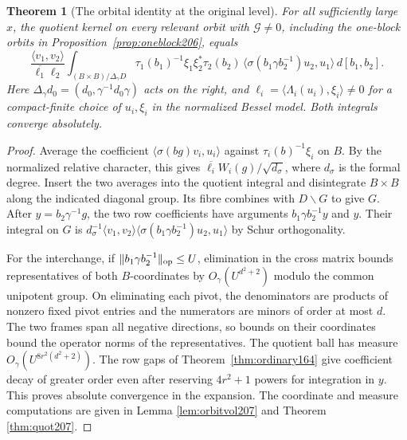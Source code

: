 \documentclass[a4paper,11pt]{article}
\newtheorem{theorem}[proposition]{Theorem}
\theoremstyle{definition}
\theoremstyle{remark}
\numberwithin{equation}{section}
\begin{document}
\begin{theorem}[The orbital identity at the original level]
\label{thm:quot208}
For all sufficiently large \(x\), the quotient kernel on every
relevant orbit with \(\mathcal G\ne0\), including the one-block
orbits in Proposition~\ref{prop:oneblock206}, equals
\begin{equation}
 \frac{\langle v_1,v_2\rangle}{\overline{\ell_1}\ell_2}
 \int_{(B\times B)/\Delta_\gamma D}
   \tau_1(b_1)^{-1}\xi_1\xi_2^*\tau_2(b_2)\,
       \langle\sigma(b_1\gamma b_2^{-1})u_2,u_1\rangle\,d[b_1,b_2].
                                                        \label{eq:quot208}
\end{equation}
Here \(\Delta_\gamma d_0=(d_0,\gamma^{-1}d_0\gamma)\) acts on the
right, and \(\ell_i=\langle\Lambda_i(u_i),\xi_i\rangle\ne0\)
for a compact-finite choice of \(u_i,\xi_i\) in the normalized
Bessel model. Both integrals converge absolutely.
\end{theorem}
\begin{proof}
Average the coefficient \(\langle\sigma(bg)v_i,u_i\rangle\)
against \(\tau_i(b)^{-1}\xi_i\) on \(B\). By the normalized
relative character, this gives
\(\overline{\ell_i}W_i(g)/\sqrt{d_\sigma}\), where \(d_\sigma\)
is the formal degree. Insert the two averages into the quotient
integral and disintegrate \(B\times B\) along the indicated
diagonal group. Its fibre combines with \(D\backslash G\)
to give \(G\). After \(y=b_2\gamma^{-1}g\), the two row
coefficients have arguments \(b_1\gamma b_2^{-1}y\) and \(y\).
Their integral on \(G\) is
\(d_\sigma^{-1}\langle v_1,v_2\rangle
\langle\sigma(b_1\gamma b_2^{-1})u_2,u_1\rangle\)
by Schur orthogonality.

For the interchange, if \(\|b_1\gamma b_2^{-1}\|_{\rm op}\le U\),
elimination in the cross matrix bounds representatives of both
\(B\)-coordinates by \(O_\gamma(U^{d^2+2})\) modulo the common
unipotent group. On eliminating each pivot, the denominators
are products of nonzero fixed pivot entries and the numerators
are minors of order at most \(d\). The two frames span all
negative directions, so bounds on their coordinates bound
the operator norms of the representatives. The quotient ball has
measure \(O_\gamma(U^{8r^2(d^2+2)})\). The row gaps of
Theorem~\ref{thm:ordinary164} give coefficient decay of greater
order even after reserving \(4r^2+1\) powers for integration
in \(y\). This proves absolute convergence in the expansion.
The coordinate and measure computations are given in
Lemma \ref{lem:orbitvol207} and Theorem \ref{thm:quot207}.
\end{proof}
\end{document}
